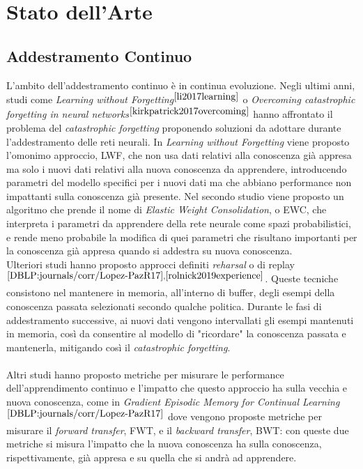\section{Stato dell'Arte}
\subsection{Addestramento Continuo} L'ambito dell'addestramento continuo è in continua evoluzione. Negli ultimi anni, studi come \textit{Learning without Forgetting}$^{\cite{li2017learning}}$ o \textit{Overcoming catastrophic forgetting in neural networks}$^{\cite{kirkpatrick2017overcoming}}$ hanno affrontato il problema del \textit{catastrophic forgetting} proponendo soluzioni da adottare durante l'addestramento delle reti neurali. In \textit{Learning without Forgetting} viene proposto l'omonimo approccio, LWF, che non usa dati relativi alla conoscenza già appresa ma solo i nuovi dati relativi alla nuova conoscenza da apprendere, introducendo parametri del modello specifici per i nuovi dati ma che abbiano performance non impattanti sulla conoscenza già presente. Nel secondo studio viene proposto un algoritmo che prende il nome di \textit{Elastic Weight Consolidation}, o EWC, che interpreta i parametri da apprendere della rete neurale come spazi probabilistici, e rende meno probabile la modifica di quei parametri che risultano importanti per la conoscenza già appresa quando si addestra su nuova conoscenza.\\
Ulteriori studi hanno proposto approcci definiti \textit{reharsal} o di replay$^{\cite{DBLP:journals/corr/Lopez-PazR17},\cite{rolnick2019experience}}$. Queste tecniche consistono nel mantenere in memoria, all'interno di buffer, degli esempi della conoscenza passata selezionati secondo qualche politica. Durante le fasi di addestramento successive, ai nuovi dati vengono intervallati gli esempi mantenuti in memoria, così da consentire al modello di "ricordare" la conoscenza passata e mantenerla, mitigando così il \textit{catastrophic forgetting}.\\\\
Altri studi hanno proposto metriche per misurare le performance dell'apprendimento continuo e l'impatto che questo approccio ha sulla vecchia e nuova conoscenza, come in \textit{Gradient Episodic Memory for Continual Learning}$^{\cite{DBLP:journals/corr/Lopez-PazR17}}$ dove vengono proposte metriche per misurare il \textit{forward transfer}, FWT, e il \textit{backward transfer}, BWT: con queste due metriche si misura l'impatto che la nuova conoscenza ha sulla conoscenza, rispettivamente, già appresa e su quella che si andrà ad apprendere.\\\\
